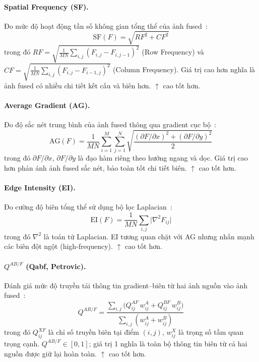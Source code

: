 \paragraph{Spatial Frequency (SF).}
Đo mức độ hoạt động tần số không gian tổng thể của ảnh fused~\cite{eskicioglu1995sf}:
\begin{equation}
\mathrm{SF}(F) = \sqrt{RF^2 + CF^2}
\end{equation}
trong đó $RF = \sqrt{\frac{1}{MN}\sum_{i,j}(F_{i,j}-F_{i,j-1})^2}$ (Row Frequency) và $CF = \sqrt{\frac{1}{MN}\sum_{i,j}(F_{i,j}-F_{i-1,j})^2}$ (Column Frequency). Giá trị cao hơn nghĩa là ảnh fused có nhiều chi tiết kết cấu và biên hơn. $\uparrow$ cao tốt hơn.

\paragraph{Average Gradient (AG).}
Đo độ sắc nét trung bình của ảnh fused thông qua gradient cục bộ~\cite{cui2015ag}:
\begin{equation}
\mathrm{AG}(F) = \frac{1}{MN}\sum_{i=1}^{M}\sum_{j=1}^{N} \sqrt{\frac{(\partial F/\partial x)^2 + (\partial F/\partial y)^2}{2}}
\end{equation}
trong đó $\partial F/\partial x$, $\partial F/\partial y$ là đạo hàm riêng theo hướng ngang và dọc. Giá trị cao hơn phản ánh ảnh fused sắc nét, bảo toàn tốt chi tiết biên. $\uparrow$ cao tốt hơn.

\paragraph{Edge Intensity (EI).}
Đo cường độ biên tổng thể sử dụng bộ lọc Laplacian~\cite{liu2020vifb}:
\begin{equation}
\mathrm{EI}(F) = \frac{1}{MN}\sum_{i,j}\bigl|\nabla^2 F_{ij}\bigr|
\end{equation}
trong đó $\nabla^2$ là toán tử Laplacian. EI tương quan chặt với AG nhưng nhấn mạnh các biên đột ngột (high-frequency). $\uparrow$ cao tốt hơn.

\paragraph{$Q^{AB/F}$ (Qabf, Petrovic).}
Đánh giá mức độ truyền tải thông tin gradient--biên từ hai ảnh nguồn vào ảnh fused~\cite{xydeas2000objective}:
\begin{equation}
Q^{AB/F} = \frac{\sum_{i,j}\bigl(Q^{AF}_{ij}\,w^A_{ij} + Q^{BF}_{ij}\,w^B_{ij}\bigr)}{\sum_{i,j}(w^A_{ij}+w^B_{ij})}
\end{equation}
trong đó $Q^{XF}_{ij}$ là chỉ số truyền biên tại điểm $(i,j)$, $w^X_{ij}$ là trọng số tầm quan trọng cạnh. $Q^{AB/F}\in[0,1]$; giá trị 1 nghĩa là toàn bộ thông tin biên từ cả hai nguồn được giữ lại hoàn toàn. $\uparrow$ cao tốt hơn.

